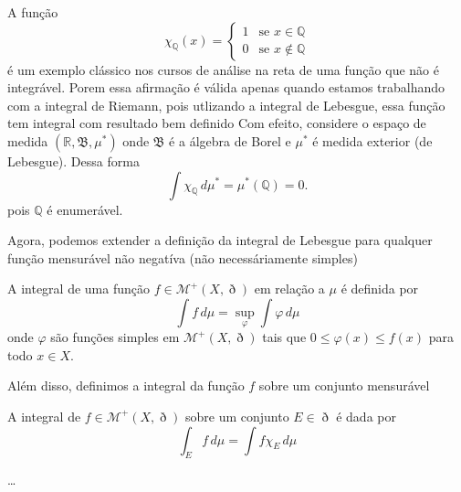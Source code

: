 \documentclass[a4paper, 11pt]{book}
\theoremstyle{definition}
\newcommand{\bQ}{\mathbb{Q}}
\newcommand{\bR}{\mathbb{R}}
\newcommand{\cB}{\mathfrak{B}}
\newcommand{\cM}{\mathcal{M}}
\begin{document}
\begin{ex}
    A função
    \[
        \chi_{\bQ}(x) = 
        \left\{  
            \begin{array}{ll}
                1 &\text{se } x \in \bQ\\
                0 &\text{se } x \not\in \bQ
            \end{array}
        \right.
    \]
    é um exemplo clássico nos cursos de análise na reta de uma função que não é integrável. 
    Porem essa afirmação é válida apenas quando estamos trabalhando com a integral de Riemann, pois utlizando a integral de Lebesgue, essa função tem integral com resultado bem definido
    Com efeito, considere o espaço de medida $(\bR, \cB, \mu^*)$ onde $\cB$ é a álgebra de Borel e $\mu^*$ é medida exterior (de Lebesgue).
    Dessa forma
    \[
        \int \chi_\bQ \,d\mu^* = \mu^*(\bQ) = 0.
    \]
    pois $\bQ$ é enumerável.
\end{ex}

Agora, podemos extender a definição da integral de Lebesgue para qualquer função mensurável não negatíva (não necessáriamente simples)

\begin{dbox}
    A integral de uma função $f \in \cM^+(X,\eth)$ em relação a $\mu$ é definida por
    \[
        \int f \, d\mu = \sup_\varphi \int \varphi \, d\mu
    \]
    onde $\varphi$ são funções simples em $\mathcal{M}^+(X,\eth)$ tais que $0 \leqslant \varphi(x) \leqslant f(x)$ para todo $x \in X$.
\end{dbox}

Além disso, definimos a integral da função $f$ sobre um conjunto mensurável

\begin{dbox}
    A integral de $f \in \cM^+(X,\eth)$ sobre um conjunto $E \in \eth$ é dada por
    \[
        \int_E f \, d\mu = \int f \chi_E \, d\mu
    \]
\end{dbox}

\dots
\end{document}
